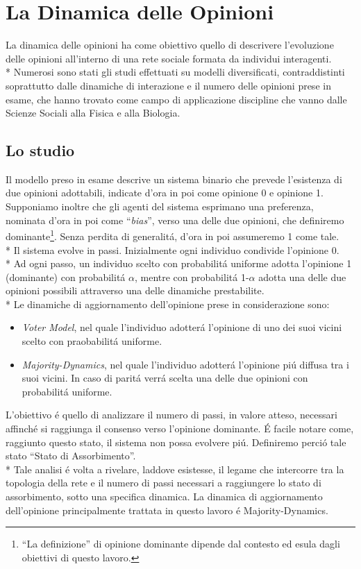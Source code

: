 \documentclass[../Tesi.tex]{subfiles}
\begin{document}
\chapter{La Dinamica delle Opinioni}
La dinamica delle opinioni ha come obiettivo quello di descrivere l'evoluzione delle opinioni all'interno di una rete sociale formata da individui interagenti.\\*
Numerosi sono stati gli studi effettuati su modelli diversificati, contraddistinti soprattutto dalle dinamiche di interazione e il numero delle opinioni prese in esame, che hanno trovato come campo di applicazione discipline che vanno dalle Scienze Sociali alla Fisica e alla Biologia.

\section{Lo studio}
Il modello preso in esame descrive un sistema binario che prevede l'esistenza di due opinioni adottabili, indicate d'ora in poi come opinione 0 e opinione 1. Supponiamo inoltre che gli agenti del sistema esprimano una preferenza, nominata d'ora in poi come ``\emph{bias}'', verso una delle due opinioni, che definiremo dominante\footnote{``La definizione'' di opinione dominante dipende dal contesto ed esula dagli obiettivi di questo lavoro.}. Senza perdita di generalit\'a, d'ora in poi assumeremo 1 come tale.\\*
Il sistema evolve in passi. Inizialmente ogni individuo condivide l'opinione 0.\\*
Ad ogni passo, un individuo scelto con probabilit\'a uniforme adotta l'opinione 1 (dominante) con probabilit\'a $\alpha$, mentre con probabilit\'a 1-$\alpha$ adotta una delle due opinioni possibili attraverso una delle dinamiche prestabilite.\\*
Le dinamiche di aggiornamento dell'opinione prese in considerazione sono:
\begin{itemize}
\item \emph{Voter Model}, nel quale l'individuo adotter\'a l'opinione di uno dei suoi vicini scelto con praobabilit\'a uniforme.
\item \emph{Majority-Dynamics}, nel quale l'individuo adotter\'a l'opinione pi\'u diffusa tra i suoi vicini. In caso di parit\'a verr\'a scelta una delle due opinioni con probabilit\'a uniforme.
\end{itemize}
L'obiettivo \'e quello di analizzare il numero di passi, in valore atteso, necessari affinch\'e si raggiunga il consenso verso l'opinione dominante. \'E facile notare come, raggiunto questo stato, il sistema non possa evolvere pi\'u. Definiremo perci\'o tale stato ``Stato di Assorbimento''.\\*
Tale analisi \'e volta a rivelare, laddove esistesse, il legame che intercorre tra la topologia della rete e il numero di passi necessari a raggiungere lo stato di assorbimento, sotto una specifica dinamica.
La dinamica di aggiornamento dell'opinione principalmente trattata in questo lavoro \'e Majority-Dynamics.
\end{document}
